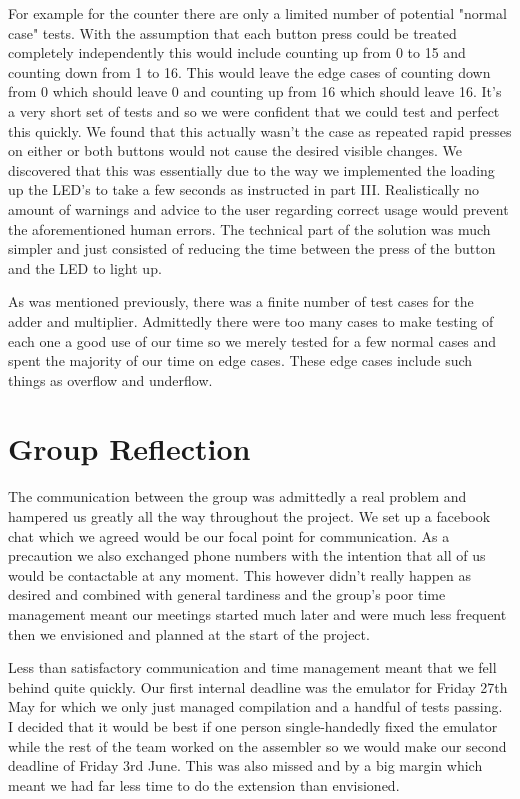 \documentclass[a4paper,12pt]{article}
\begin{document}
For example for the counter there are only a limited number of potential "normal case" tests. With the assumption that each button press could be treated completely independently this would include counting up from 0 to 15 and counting down from 1 to 16. This would leave the edge cases of counting down from 0 which should leave 0 and counting up from 16 which should leave 16. It's a very short set of tests and so we were confident that we could test and perfect this quickly. We found that this actually wasn't the case as repeated rapid presses on either or both buttons would not cause the desired visible changes. We discovered that this was essentially due to the way we implemented the loading up the LED's to take a few seconds as instructed in part III. Realistically no amount of warnings and advice to the user regarding correct usage would prevent the aforementioned human errors. The technical part of the solution was much simpler and just consisted of reducing the time between the press of the button and the LED to light up.

As was mentioned previously, there was a finite number of test cases for the adder and multiplier. Admittedly there were too many cases to make testing of each one a good use of our time so we merely tested for a few normal cases and spent the majority of our time on edge cases. These edge cases include such things as overflow and underflow.

\section{Group Reflection}

The communication between the group was admittedly a real problem and hampered us greatly all the way throughout the project. We set up a facebook chat which we agreed would be our focal point for communication. As a precaution we also exchanged phone numbers with the intention that all of us would be contactable at any moment. This however didn't really happen as desired and combined with general tardiness and the group's poor time management meant our meetings started much later and were much less frequent then we envisioned and planned at the start of the project. 

Less than satisfactory communication and time management meant that we fell behind quite quickly. Our first internal deadline was the emulator for Friday 27th May for which we only just managed compilation and a handful of tests passing. I decided that it would be best if one person single-handedly fixed the emulator while the rest of the team worked on the assembler so we would make our second deadline of Friday 3rd June. This was also missed and by a big margin which meant we had far less time to do the extension than envisioned.
\end{document}
